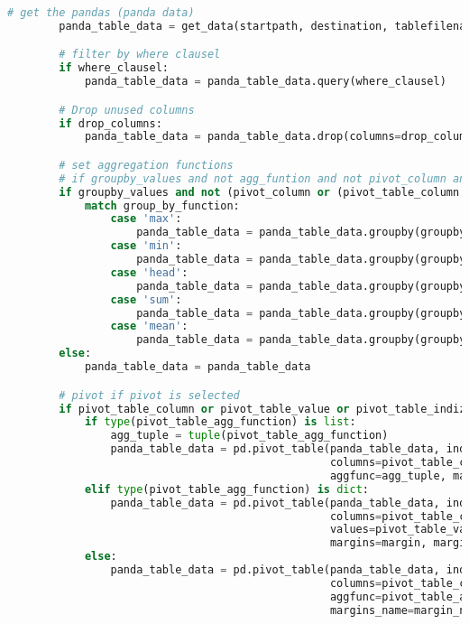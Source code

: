 \begin{lstlisting}[language=python, caption=pandas_dataframe_to_latex_table.py CSV - LaTex Tabelle,captionpos=b,label={lst:Python LaTex - pandas_dataframe_to_latex_table},breaklines=true]
        # get the pandas (panda data)
        panda_table_data = get_data(startpath, destination, tablefilename, datafile_path, datafile, alternative_cvs_load, separator, decimal)

        # filter by where clausel
        if where_clausel:
            panda_table_data = panda_table_data.query(where_clausel)

        # Drop unused columns
        if drop_columns:
            panda_table_data = panda_table_data.drop(columns=drop_columns)

        # set aggregation functions
        # if groupby_values and not agg_funtion and not pivot_column and not pivot_table_column:
        if groupby_values and not (pivot_column or (pivot_table_column or pivot_table_value or pivot_table_indizes)):
            match group_by_function:
                case 'max':
                    panda_table_data = panda_table_data.groupby(groupby_values, as_index=False).max()
                case 'min':
                    panda_table_data = panda_table_data.groupby(groupby_values, as_index=False).min()
                case 'head':
                    panda_table_data = panda_table_data.groupby(groupby_values, as_index=False).head()
                case 'sum':
                    panda_table_data = panda_table_data.groupby(groupby_values, as_index=False).sum()
                case 'mean':
                    panda_table_data = panda_table_data.groupby(groupby_values, as_index=False).mean()
        else:
            panda_table_data = panda_table_data

        # pivot if pivot is selected
        if pivot_table_column or pivot_table_value or pivot_table_indizes:
            if type(pivot_table_agg_function) is list:
                agg_tuple = tuple(pivot_table_agg_function)
                panda_table_data = pd.pivot_table(panda_table_data, index=pivot_table_indizes,
                                                  columns=pivot_table_column, values=pivot_table_value,
                                                  aggfunc=agg_tuple, margins=margin, margins_name=margin_name)
            elif type(pivot_table_agg_function) is dict:
                panda_table_data = pd.pivot_table(panda_table_data, index=pivot_table_indizes,
                                                  columns=pivot_table_column,
                                                  values=pivot_table_value, aggfunc=pivot_table_agg_function,
                                                  margins=margin, margins_name=margin_name)
            else:
                panda_table_data = pd.pivot_table(panda_table_data, index=pivot_table_indizes,
                                                  columns=pivot_table_column, values=pivot_table_value,
                                                  aggfunc=pivot_table_agg_function, margins=margin,
                                                  margins_name=margin_name)


\end{lstlisting}
